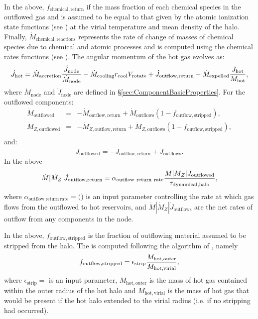 In the above, $f_\mathrm{chemical,return}$ if the mass fraction of each chemical species in the outflowed gas and is assumed to be equal to that given by the atomic ionization state functions (see ) at the virial temperature and mean density of the halo. Finally, $\dot{M}_\mathrm{chemical,reactions}$ represents the rate of change of masses of chemical species due to chemical and atomic processes and is computed using the chemical rates functions (see ). The angular momentum of the hot gas evolves as:
\begin{equation}
 \dot{J}_\mathrm{hot} = \dot{M}_\mathrm{accretion} {\dot{J}_\mathrm{node} \over \dot{M}_\mathrm{node}} - \dot{M}_\mathrm{cooling} r_\mathrm{cool} V_\mathrm{rotate} + \dot{J}_\mathrm{outflow,return} - \dot{M}_\mathrm{expelled} {J_\mathrm{hot} \over M_\mathrm{hot}},
\end{equation}
where $\dot{M}_\mathrm{node}$ and $\dot{J}_\mathrm{node}$ are defined in \S\ref{sec:ComponentBasicProperties}. For the outflowed components:
\begin{eqnarray}
 \dot{M}_\mathrm{outflowed} &=& - \dot{M}_\mathrm{outflow,return} + \dot{M}_\mathrm{outflows} (1-f_\mathrm{outflow, stripped}), \\
 \dot{M}_{Z, \mathrm{outflowed}} &=& - \dot{M}_{Z, \mathrm{outflow,return}} + \dot{M}_{Z, \mathrm{outflows}} (1-f_\mathrm{outflow, stripped}), \\
\end{eqnarray}
and:
\begin{equation}
 \dot{J}_\mathrm{outflowed} = - \dot{J}_\mathrm{outflow,return} + \dot{J}_\mathrm{outflows}.
\end{equation}
In the above
\begin{equation}
 \dot{M}|\dot{M}_Z|\dot{J}_\mathrm{outflow,return} = \alpha_\mathrm{outflow~return~rate} {M|M_Z|J_\mathrm{outflowed}\over \tau_\mathrm{dynamical, halo}},
\end{equation}
where $\alpha_\mathrm{outflow~return~rate}=($) is an input parameter controlling the rate at which gas flows from the outflowed to hot reservoirs, and $\dot{M}|\dot{M}_Z|\dot{J}_\mathrm{outflows}$ are the net rates of outflow from any components in the node.

In the above, $f_\mathrm{outflow, stripped}$ is the fraction of outflowing material assumed to be stripped from the halo. The is computed following the algorithm of \cite{font_colours_2008}, namely
\begin{equation}
f_\mathrm{outflow, stripped} = \epsilon_\mathrm{strip} {M_\mathrm{hot, outer} \over  M_\mathrm{hot, virial}},
\end{equation}
where $\epsilon_\mathrm{strip}=$\mono{[hotHaloOutflowStrippingEfficiency]} is an input parameter, $M_\mathrm{hot, outer}$ is the mass of hot gas contained within the outer radius of the hot halo and $M_\mathrm{hot, virial}$ is the mass of hot gas that would be present if the hot halo extended to the virial radius (i.e. if no stripping had occurred).

